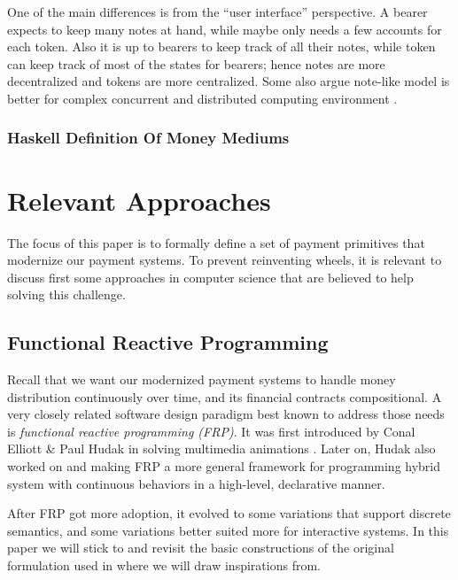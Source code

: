 One of the main differences is from the ``user interface'' perspective. A bearer expects to keep
many notes at hand, while maybe only needs a few accounts for each token. Also it is up to bearers
to keep track of all their notes, while token can keep track of most of the states for bearers;
hence notes are more decentralized and tokens are more centralized. Some also argue note-like model
is better for complex concurrent and distributed computing environment
.

\subsubsection{Haskell Definition Of Money Mediums}



\section{Relevant Approaches}

The focus of this paper is to formally define a set of payment primitives that modernize our payment
systems. To prevent reinventing wheels, it is relevant to discuss first some approaches in computer
science that are believed to help solving this challenge.

\subsection{Functional Reactive Programming}

Recall that we want our modernized payment systems to handle money distribution continuously over
time, and its financial contracts compositional. A very closely related software design paradigm
best known to address those needs is \textit{functional reactive programming (FRP)}.  It was first
introduced by Conal Elliott \& Paul Hudak in solving multimedia
animations \cite{elliott1997functional}. Later on, Hudak also worked on \cite{hudak2002arrows} and
\cite{wan2000functional} making FRP a more general framework for programming hybrid system with
continuous behaviors in a high-level, declarative manner.

After FRP got more adoption, it evolved to some variations that support discrete semantics, and some
variations better suited more for interactive systems. In this paper we will stick to and revisit
the basic constructions of the original formulation used in \cite{elliott1997functional} where we
will draw inspirations from.

